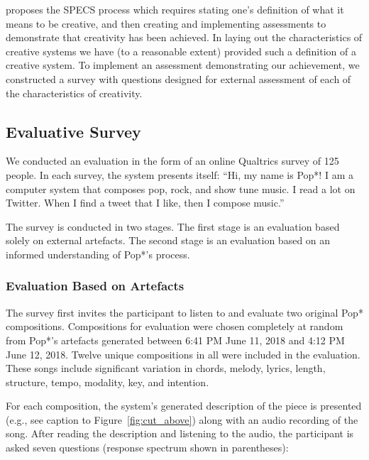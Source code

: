 \documentclass[phd,electronic,oneside,twosidetoc,letterpaper,chaptercenter,parttop,lof,lot]{byumsphd}
\begin{document}
\citeauthor{Jordanous2012ACreative} \cite{Jordanous2012ACreative} proposes the SPECS process which requires stating one's definition of what it means to be creative, and then creating and implementing assessments to demonstrate that creativity has been achieved. In laying out the characteristics of creative systems we have (to a reasonable extent) provided such a definition of a creative system. To implement an assessment demonstrating our achievement, we constructed a survey with questions designed for external assessment of each of the characteristics of creativity. 

\subsection{Evaluative Survey}

We conducted an evaluation in the form of an online Qualtrics survey of 125 people. In each survey, the system presents itself: ``Hi, my name is Pop*! I am a computer system that composes pop, rock, and show tune music. I read a lot on Twitter. When I find a tweet that I like, then I compose music.''

The survey is conducted in two stages. The first stage is an evaluation based solely on external artefacts. The second stage is an evaluation based on an informed understanding of Pop*'s process. 

\subsubsection{Evaluation Based on Artefacts} The survey first invites the participant to listen to and evaluate two original Pop* compositions. Compositions for evaluation were chosen completely at random from Pop*'s artefacts generated between 6:41 PM June 11, 2018 and 4:12 PM June 12, 2018. Twelve unique compositions in all were included in the evaluation. These songs include significant variation in chords, melody, lyrics, length, structure, tempo, modality, key, and intention. 

For each composition, the system's generated description of the piece is presented (e.g., see caption to Figure~\ref{fig:cut_above}) along with an audio recording of the song. After reading the description and listening to the audio, the participant is asked seven questions (response spectrum shown in parentheses):
\end{document}
